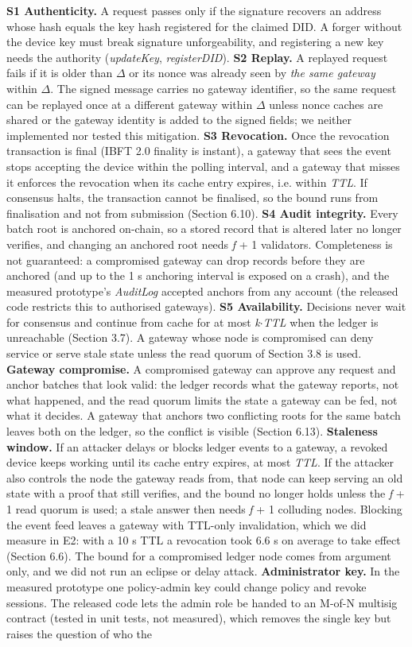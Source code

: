 \documentclass[a4paper,5p,times,twocolumn,number,sort&compress]{elsarticle}
\begin{document}
\textbf{S1 Authenticity.} A request passes only if the signature recovers an address whose hash equals the key hash registered for the claimed DID. A forger without the device key must break signature unforgeability, and registering a new key needs the authority (\emph{updateKey}, \emph{registerDID}). \textbf{S2 Replay.} A replayed request fails if it is older than $\Delta$ or its nonce was already seen by \emph{the same gateway} within $\Delta$. The signed message carries no gateway identifier, so the same request can be replayed once at a different gateway within $\Delta$ unless nonce caches are shared or the gateway identity is added to the signed fields; we neither implemented nor tested this mitigation. \textbf{S3 Revocation.} Once the revocation transaction is final (IBFT 2.0 finality is instant), a gateway that sees the event stops accepting the device within the polling interval, and a gateway that misses it enforces the revocation when its cache entry expires, i.e. within \emph{TTL}. If consensus halts, the transaction cannot be finalised, so the bound runs from finalisation and not from submission (Section 6.10). \textbf{S4 Audit integrity.} Every batch root is anchored on-chain, so a stored record that is altered later no longer verifies, and changing an anchored root needs \emph{f} + 1 validators. Completeness is not guaranteed: a compromised gateway can drop records before they are anchored (and up to the 1 s anchoring interval is exposed on a crash), and the measured prototype's \emph{AuditLog} accepted anchors from any account (the released code restricts this to authorised gateways). \textbf{S5 Availability.} Decisions never wait for consensus and continue from cache for at most \emph{k}$\cdot$\emph{TTL} when the ledger is unreachable (Section 3.7). A gateway whose node is compromised can deny service or serve stale state unless the read quorum of Section 3.8 is used. \textbf{Gateway compromise.} A compromised gateway can approve any request and anchor batches that look valid: the ledger records what the gateway reports, not what happened, and the read quorum limits the state a gateway can be fed, not what it decides. A gateway that anchors two conflicting roots for the same batch leaves both on the ledger, so the conflict is visible (Section 6.13). \textbf{Staleness window.} If an attacker delays or blocks ledger events to a gateway, a revoked device keeps working until its cache entry expires, at most \emph{TTL}. If the attacker also controls the node the gateway reads from, that node can keep serving an old state with a proof that still verifies, and the bound no longer holds unless the \emph{f} + 1 read quorum is used; a stale answer then needs \emph{f} + 1 colluding nodes. Blocking the event feed leaves a gateway with TTL-only invalidation, which we did measure in E2: with a 10 s TTL a revocation took 6.6 s on average to take effect (Section 6.6). The bound for a compromised ledger node comes from argument only, and we did not run an eclipse or delay attack. \textbf{Administrator key.} In the measured prototype one policy-admin key could change policy and revoke sessions. The released code lets the admin role be handed to an M-of-N multisig contract (tested in unit tests, not measured), which removes the single key but raises the question of who the 
\end{document}
